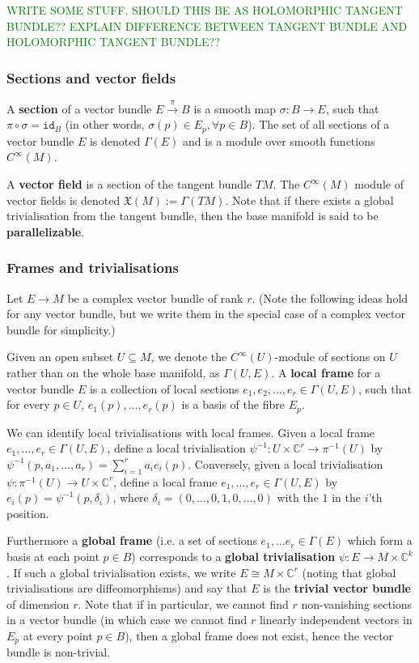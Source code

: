 \documentclass[a4paper]{article}
\theoremstyle{definition} \newtheorem*{definition}{Definition}
\theoremstyle{definition} \newtheorem*{definitions}{Definitions}
\theoremstyle{plain} \newtheorem{theorem}{Theorem}[section]
\theoremstyle{plain} \newtheorem{proposition}[theorem]{Proposition}
\theoremstyle{plain} \newtheorem{corollary}[theorem]{Corollary}
\theoremstyle{plain} \newtheorem{lemma}[theorem]{Lemma}
\theoremstyle{plain} \newtheorem{example}[theorem]{Example}
\newcommand{\finish}[1]{\textcolor{green}{#1}}
\newcommand{\defn}[1]{\textbf{#1}}
\newcommand{\complexnos}{\mathbb{C}}
\newcommand{\id}{\mathtt{id}}
\begin{document}
\finish{WRITE SOME STUFF. SHOULD THIS BE AS HOLOMORPHIC TANGENT BUNDLE?? EXPLAIN DIFFERENCE BETWEEN TANGENT BUNDLE AND HOLOMORPHIC TANGENT BUNDLE??}


\subsubsection{Sections and vector fields}

A \defn{section} of a vector bundle $E\xrightarrow{\pi} B$ is a smooth map $\sigma:B\rightarrow E$, such that $\pi \circ \sigma=\id_B$ (in other words, $\sigma(p)\in E_p, \forall p\in B$). The set of all sections of a vector bundle $E$ is denoted $\Gamma (E)$ and is a module over smooth functions $C^\infty(M)$.

A \defn{vector field} is a section of the tangent bundle $TM$. The $C^\infty (M)$ module of vector fields is denoted $\mathfrak{X}(M):=\Gamma(TM)$. Note that if there exists a global trivialisation from the tangent bundle, then the base manifold is said to be \defn{parallelizable}. 

\subsubsection{Frames and trivialisations}

Let $E\to M$ be a complex vector bundle of rank $r$. (Note the following ideas hold for any vector bundle, but we write them in the special case of a complex vector bundle for simplicity.) 

Given an open subset $U\subseteq M$, we denote the $C^\infty (U)$-module of sections on $U$ rather than on the whole base manifold, as $\Gamma (U, E)$. A \defn{local frame} for a vector bundle $E$ is a collection of local sections $e_1, e_2, \ldots, e_r\in \Gamma (U, E)$, such that for every $p\in U$, $e_1(p),\ldots, e_r(p)$ is a basis of the fibre $E_p$. 

We can identify local trivialisations with local frames. Given a local frame $e_1, \ldots, e_r\in \Gamma(U, E)$, define a local trivialisation $\psi^{-1}:U\times \complexnos^r \to \pi^{-1}(U)$ by
$\psi^{-1}(p, a_1, \ldots, a_r) = \sum_{i=1}^r a_ie_i(p)$. Conversely, given a local trivialisation $\psi:\pi^{-1}(U) \to U\times \complexnos^r$, define a local frame $e_1,\ldots , e_r\in \Gamma(U, E)$ by $e_i(p)=\psi^{-1} (p, \delta_i)$, where $\delta_i = (0, \ldots, 0, 1, 0, \ldots, 0)$ with the $1$ in the $i$'th position. 

Furthermore a \defn{global frame} (i.e. a set of sections $e_1, \ldots e_r\in \Gamma(E)$ which form a basis at each point $p\in B$) corresponds to a \defn{global trivialisation} $\psi:E \to M\times \complexnos^k$. If such a global trivialisation exists, we write $E\cong M\times \complexnos^r$ (noting that global trivialisations are diffeomorphisms) and say that $E$ is the \defn{trivial vector bundle} of dimension $r$. 
Note that if in particular, we cannot find $r$ non-vanishing sections in a vector bundle (in which case we cannot find $r$ linearly independent vectors in $E_p$ at every point $p\in B$), then a global frame does not exist, hence the vector bundle is non-trivial.  
\end{document}
